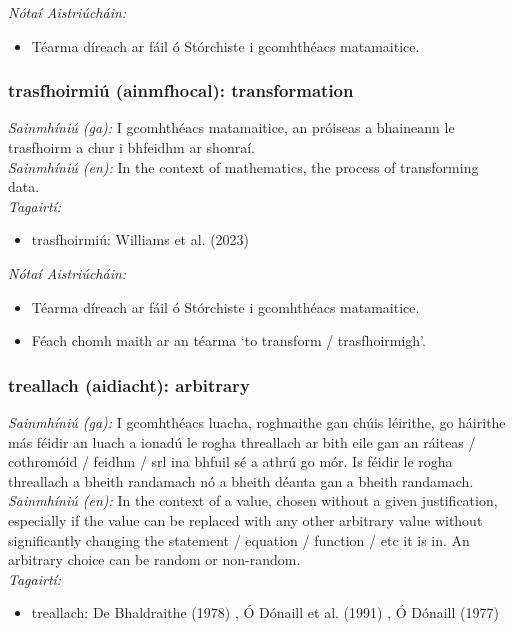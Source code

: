  \noindent \textit{Nótaí Aistriúcháin:}
\begin{itemize}
	\item Téarma díreach ar fáil ó Stórchiste i gcomhthéacs matamaitice.
\end{itemize}


\subsubsection*{trasfhoirmiú (ainmfhocal): transformation}
 \noindent \textit{Sainmhíniú (ga):} I gcomhthéacs matamaitice, an próiseas a bhaineann le trasfhoirm a chur i bhfeidhm ar shonraí.
\\
 \noindent \textit{Sainmhíniú (en):} In the context of mathematics, the process of transforming data.
\\
 \noindent \textit{Tagairtí:}
\begin{itemize}
	\item trasfhoirmiú: Williams et al. (2023) \cite{storchiste}
\end{itemize}

 \noindent \textit{Nótaí Aistriúcháin:}
\begin{itemize}
	\item Téarma díreach ar fáil ó Stórchiste i gcomhthéacs matamaitice.
	\item Féach chomh maith ar an téarma `to transform / trasfhoirmigh'.
\end{itemize}


\subsubsection*{treallach (aidiacht): arbitrary}
 \noindent \textit{Sainmhíniú (ga):} I gcomhthéacs luacha, roghnaithe gan chúis léirithe, go háirithe más féidir an luach a ionadú le rogha threallach ar bith eile gan an ráiteas / cothromóid / feidhm / srl ina bhfuil sé a athrú go mór. Is féidir le rogha threallach a bheith randamach nó a bheith déanta gan a bheith randamach.
\\
 \noindent \textit{Sainmhíniú (en):} In the context of a value, chosen without a given justification, especially if the value can be replaced with any other arbitrary value without significantly changing the statement / equation / function / etc it is in. An arbitrary choice can be random or non-random.
\\
 \noindent \textit{Tagairtí:}
\begin{itemize}
	\item treallach: De Bhaldraithe (1978) \cite{de-bhaldraithe}, Ó Dónaill et al. (1991) \cite{focloir-beag}, Ó Dónaill (1977) \cite{odonaill}
\end{itemize}


